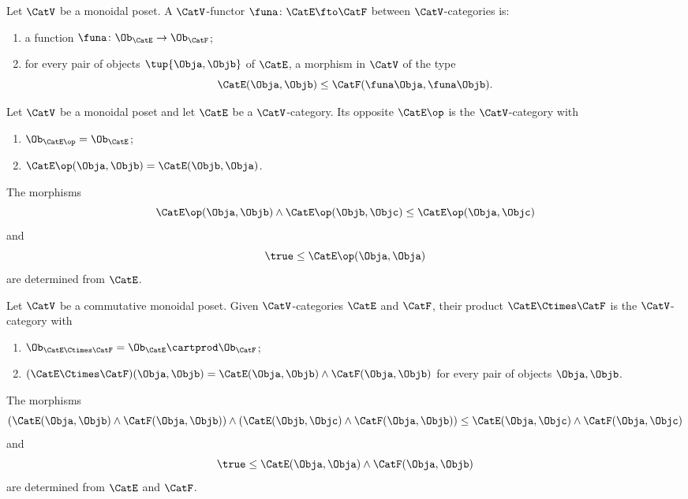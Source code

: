 \begin{ctdefinition}
Let $\CatV$ be a monoidal poset. A $\CatV$-functor $\funa \colon \CatE \fto \CatF$ between $\CatV$-categories is:

\constit
\begin{enumerate}
\item a function $\funa \colon \Ob_\CatE \to \Ob_\CatF$;
\item for every pair of objects $\tup{\Obja, \Objb}$ of $\CatE$, a morphism in $\CatV$ of the type
\begin{equation}
\CatE(\Obja, \Objb) \leq \CatF(\funa \Obja, \funa \Objb). 
\end{equation}
\end{enumerate}
\end{ctdefinition}


\begin{ctdefinition}
\label{def:monoidal-poset-cat-op}
Let $\CatV$ be a monoidal poset and let $\CatE$ be a $\CatV$-category. Its opposite $\CatE\op$ is the $\CatV$-category with 
\begin{enumerate}
\item $\Ob_{\CatE\op} = \Ob_\CatE$;
\item $\CatE\op(\Obja, \Objb) = \CatE(\Objb, \Obja)$.
\end{enumerate}

The morphisms 
\begin{equation}
\CatE\op(\Obja, \Objb) \wedge \CatE\op(\Objb, \Objc) \leq \CatE\op(\Obja, \Objc)
\end{equation}
and
\begin{equation}
\true \leq \CatE\op(\Obja, \Obja)
\end{equation}
are determined from $\CatE$.
\end{ctdefinition}

\begin{ctdefinition}
\label{def:monoidal-poset-cat-product}
Let $\CatV$ be a commutative monoidal poset. Given $\CatV$-categories $\CatE$ and $\CatF$, their product $\CatE \Ctimes \CatF$ is the $\CatV$-category with 
\begin{enumerate}
\item $\Ob_{\CatE \Ctimes \CatF} = \Ob_\CatE \cartprod \Ob_\CatF$;
\item $(\CatE \Ctimes \CatF)(\Obja, \Objb) = \CatE (\Obja, \Objb) \wedge \CatF (\Obja, \Objb)$ for every pair of objects $\Obja, \Objb$. 
\end{enumerate}
The morphisms 
\begin{equation}
(\CatE(\Obja, \Objb) \wedge \CatF(\Obja, \Objb)) \wedge (\CatE(\Objb, \Objc) \wedge \CatF(\Obja, \Objb)) \leq \CatE(\Obja, \Objc) \wedge  \CatF(\Obja, \Objc)
\end{equation}
and
\begin{equation}
\true \leq \CatE(\Obja, \Obja) \wedge \CatF(\Obja, \Objb)
\end{equation}
are determined from $\CatE$ and $\CatF$.
\end{ctdefinition}


